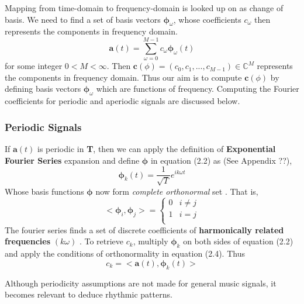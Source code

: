 \noindent Mapping from time-domain to frequency-domain is looked up on as change of basis. We need to find a set of basis vectors $\bm{\phi}_{ \omega }$, whose coefficients $c_{ \omega }$ then represents the components in frequency domain. 
\begin{equation}
\textbf{a}(t) = \displaystyle\sum_{ \omega =0}^{M-1}c_{ \omega }\bm{\phi}_{ \omega }(t) 
\end{equation}
for some integer $0 < M < \infty$. Then $\textbf{c}(\phi) = (c_{0},c_{1}, ...,c_{M-1}) \in \mathbb{C}^M $ represents the components in frequency domain. Thus our aim is to compute $\textbf{c}(\phi)$ by defining basis vectors $\bm{\phi}_{\omega}$ which are functions of frequency. Computing the Fourier coefficients for periodic and aperiodic signals are discussed below.

\subsubsection{Periodic Signals}
If $\textbf{a}(t)$ is periodic in \textbf{T}, then we can apply the definition of \textbf{Exponential Fourier Series} expansion and define $\bm{\phi}$ in equation (2.2) as (See Appendix ??),
\begin{equation}
\bm{\phi}_{k}(t) = \frac{1}{\sqrt{T}}e^{ik \omega t}
\end{equation}    
Whose basis functions $\bm{\phi}$ now form \textit{complete orthonormal} set \cite{allen}. That is, 
\begin{equation}
 < \bm{\phi}_{i}, \bm{\phi}_{j} > =
	\begin{cases}
	  0 & i \neq j \\
	  1 &  i = j \\ 
	\end{cases}
\end{equation}
The fourier series finds a set of discrete coefficients of \textbf{harmonically related frequencies} $(k \omega )$ . To retrieve $c_{k}$, multiply $\bm{\phi}_{k}$ on both sides of equation (2.2) and apply the conditions of orthonormality in equation (2.4). Thus
\begin{equation}
c_{k} = <\textbf{a}(t), \bm{\phi}_{k}(t)>
\end{equation}

Although periodicity assumptions are not made for general music signals, it becomes relevant to deduce rhythmic patterns. 

